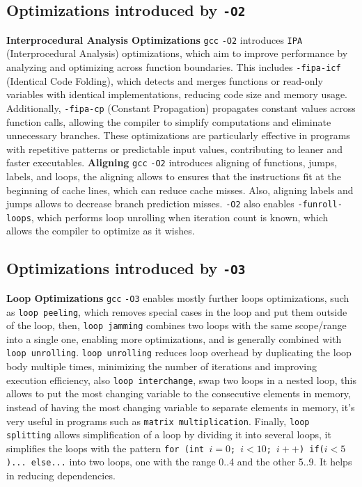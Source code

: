 \documentclass{rapport}
\newcommand{\gcc}{\texttt{gcc} }
\newcommand{\optitwo}{\texttt{-O2} }
\newcommand{\optithree}{\texttt{-O3} }
\begin{document}
\subsection*{Optimizations introduced by \optitwo}
\textbf{Interprocedural Analysis Optimizations} \newline
\gcc \optitwo introduces \texttt{IPA} (Interprocedural Analysis) optimizations, which aim to improve performance by analyzing and optimizing across function boundaries. 
This includes \texttt{-fipa-icf} (Identical Code Folding), which detects and merges functions or read-only variables with identical implementations, reducing code size and memory usage. 
\newline
Additionally, \texttt{-fipa-cp} (Constant Propagation) propagates constant values across function calls, allowing the compiler to simplify computations and eliminate unnecessary branches. 
These optimizations are particularly effective in programs with repetitive patterns or predictable input values, contributing to leaner and faster executables.
\newline
\newline
\textbf{Aligning}\newline
\gcc \optitwo introduces aligning of functions, jumps, labels, and loops, the aligning allows to ensures that the instructions fit at the beginning of cache lines, which can reduce 
cache misses. Also, aligning labels and jumps allows to decrease branch prediction misses.
\newline\newline
\optitwo also enables \texttt{-funroll-loops}, which performs loop unrolling when iteration count is known, which allows the compiler to optimize as it wishes.

\subsection*{Optimizations introduced by \optithree}
\textbf{Loop Optimizations} \newline
\gcc \optithree enables mostly further loops optimizations, such as \texttt{loop peeling}, which removes special cases in the loop and put them outside of the 
loop, then, \texttt{loop jamming} combines two loops with the same scope/range into a single one, enabling more optimizations, and is generally combined with \texttt{loop unrolling}.
\newline
\texttt{loop unrolling} reduces loop overhead by duplicating the loop body multiple times, minimizing the number of iterations and improving execution efficiency, also 
\texttt{loop interchange}, swap two loops in a nested loop, this allows to put the most changing variable to the consecutive elements in memory, instead of having the most 
changing variable to separate elements in memory, it's very useful in programs such as \texttt{matrix multiplication}. 
\newline
Finally, \texttt{loop splitting} allows simplification of a loop 
by dividing it into several loops, it simplifies the loops with the pattern \texttt{for (int $i=0$; $i<10$; $i++$) if($i<5$)... else...} into two loops, one with the range 0..4 and 
the other 5..9. It helps in reducing dependencies.
\end{document}
